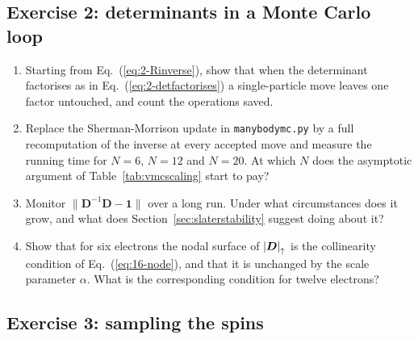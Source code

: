 \subsection*{Exercise 2: determinants in a Monte Carlo loop}
\label{ex:16-determinant}

\begin{enumerate}
\item[a)] Starting from Eq.~(\ref{eq:2-Rinverse}), show that when the
  determinant factorises as in Eq.~(\ref{eq:2-detfactorises}) a single-particle
  move leaves one factor untouched, and count the operations saved.

\item[b)] Replace the Sherman-Morrison update in \texttt{manybodymc.py} by a
  full recomputation of the inverse at every accepted move and measure the
  running time for $N=6$, $N=12$ and $N=20$.  At which $N$ does the asymptotic
  argument of Table~\ref{tab:vmcscaling} start to pay?

\item[c)] Monitor $\|\bm{D}^{-1}\bm{D}-\bm{1}\|$ over a long run.  Under what
  circumstances does it grow, and what does
  Section~\ref{sec:slaterstability} suggest doing about it?

\item[d)] Show that for six electrons the nodal surface of
  ${|\boldsymbol{D}|}_{\uparrow}$ is the collinearity condition of
  Eq.~(\ref{eq:16-node}), and that it is unchanged by the scale parameter
  $\alpha$.  What is the corresponding condition for twelve electrons?
\end{enumerate}

\subsection*{Exercise 3: sampling the spins}
\label{ex:16-spin}

